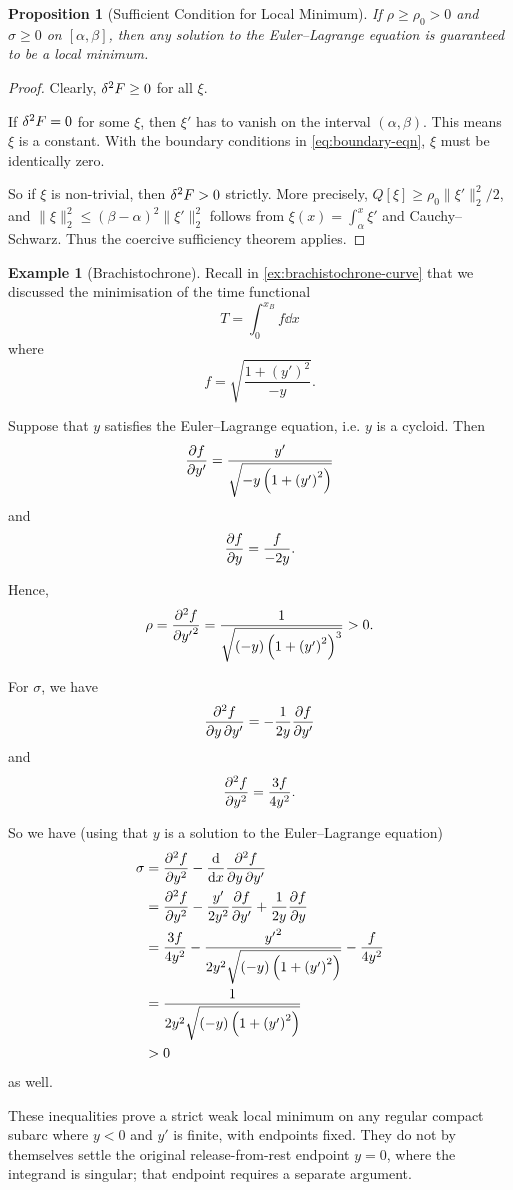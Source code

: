 \documentclass[11pt]{article}
\numberwithin{equation}{section}
\newtheorem{proposition}[theorem]{Proposition}
\theoremstyle{definition}
\newtheorem{example}[theorem]{Example}
\theoremstyle{remark}
\newcommand{\pqty}[1]{\left(#1\right)}
\newcommand{\oointv}[2]{(#1,#2)}
\begin{document}
\begin{proposition}[Sufficient Condition for Local Minimum]\label{variation-unit-0097}
    If \(\rho\ge\rho_0>0\) and \(\sigma\ge0\) on \([\alpha,\beta]\), then any solution to the Euler--Lagrange equation is guaranteed to be a local minimum.
\end{proposition}

\begin{proof}
    Clearly, \(\var[2]{F} \geq 0\) for all \(\xi\).
    
    If \(\var[2]{F} = 0\) for some \(\xi\), then \(\xi'\) has to vanish on the interval \(\oointv{\alpha}{\beta}\). This means \(\xi\) is a constant. With the boundary conditions in \autoref{eq:boundary-eqn}, \(\xi\) must be identically zero.

    So if \(\xi\) is non-trivial, then \(\var[2]{F} > 0\) strictly. More precisely, \(Q[\xi]\ge\rho_0\|\xi\prime\|_2^2/2\), and \(\|\xi\|_2^2\le(\beta-\alpha)^2\|\xi\prime\|_2^2\) follows from \(\xi(x)=\int_\alpha^x\xi\prime\) and Cauchy--Schwarz. Thus the coercive sufficiency theorem applies.
\end{proof}

\begin{example}[Brachistochrone]\label{variation-unit-0098}
    Recall in \autoref{ex:brachistochrone-curve} that we discussed the minimisation of the time functional
    \[
        T = \int_{0}^{x_B} f \dd{x}
    \]
    where
    \[
        f = \sqrt{\frac{1 + \pqty{y'}^2}{-y}}.
    \]

    Suppose that \(y\) satisfies the Euler--Lagrange equation, i.e. \(y\) is a cycloid. Then
    \[
        \pdv{f}{y'} = \frac{y'}{\sqrt{-y \pqty{1 + \pqty{y'}^2}}}
    \]
    and
    \[
        \pdv{f}{y} = \frac{f}{-2y}.
    \]

    Hence,
    \[
        \rho = \pdv[2]{f}{{y'}} = \frac{1}{\sqrt{\pqty{-y} \pqty{1 + \pqty{y'}^2}^3}} > 0.
    \]

    For \(\sigma\), we have
    \[
        \pdv{f}{y}{y'} = -\frac{1}{2y} \pdv{f}{y'}
    \]
    and
    \[
        \pdv[2]{f}{y} = \frac{3f}{4y^2}.
    \]

    So we have (using that \(y\) is a solution to the Euler--Lagrange equation)
    \begin{align*}
        \sigma &= \pdv[2]{f}{y} - \dv{x} \pdv{f}{y}{y'} \\
        &= \pdv[2]{f}{y} - \frac{y'}{2 y^2} \pdv{f}{y'} + \frac{1}{2y} \pdv{f}{y} \\
        &= \frac{3f}{4 y^2} - \frac{{y'}^2}{2 y^2 \sqrt{\pqty{-y} \pqty{1 + \pqty{y'}^2}}} - \frac{f}{4y^2}\\
        &= \frac{1}{2 y^2 \sqrt{\pqty{-y} \pqty{1 + \pqty{y'}^2}}} \\
        &> 0
    \end{align*}
    as well.

    These inequalities prove a strict weak local minimum on any regular compact subarc where \(y<0\) and \(y\prime\) is finite, with endpoints fixed. They do not by themselves settle the original release-from-rest endpoint \(y=0\), where the integrand is singular; that endpoint requires a separate argument.
\end{example}
\end{document}
